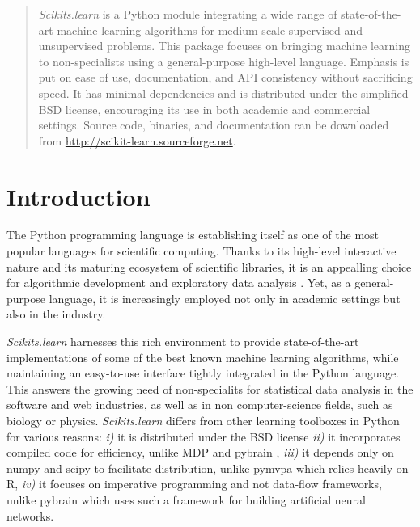 \documentclass[twoside,11pt]{article}
\begin{document}

\maketitle

\begin{abstract} 
%
\emph{Scikits.learn} is a Python module integrating a wide range of
state-of-the-art machine learning algorithms for medium-scale supervised
and unsupervised problems. This package focuses on bringing machine
learning to non-specialists using a general-purpose high-level language.
Emphasis is put on ease of use, documentation, and API consistency
without sacrificing speed.
%
It has minimal dependencies and is distributed under the simplified BSD
license, encouraging its use in both academic and commercial settings.
Source code, binaries, and documentation can be downloaded from
\url{http://scikit-learn.sourceforge.net}.

\end{abstract}





\section{Introduction}

The Python programming language is establishing itself as one of the most
popular languages for scientific computing. Thanks to its high-level interactive
nature and its maturing ecosystem of scientific libraries, it is an appealling
choice for algorithmic development and exploratory data analysis
\citep{cise2007,cise2011}. Yet, as a general-purpose language, it is
increasingly employed not only in academic settings but also in
the industry. 

{\sl Scikits.learn} harnesses this rich environment to provide state-of-the-art
implementations of some
of the best known machine learning algorithms, while maintaining an
easy-to-use interface tightly integrated in the Python language. This answers the
growing need of non-specialits for statistical data analysis in the software and web
industries, as well as in non computer-science fields, such as biology or physics.
\emph{Scikits.learn} differs from other learning toolboxes in Python for
various reasons: \emph{i)} it is distributed under the BSD license
\emph{ii)} it incorporates compiled code for efficiency, unlike MDP
\citep{zito2008} and pybrain \citep{schaul2010}, \emph{iii)} it depends
only on numpy and scipy to facilitate distribution, unlike pymvpa
\citep{hanke2009} which relies heavily on R, \emph{iv)} it focuses on imperative
programming and not data-flow frameworks, unlike pybrain which uses such a framework
for building artificial neural networks.
\end{document}
